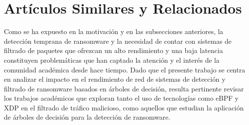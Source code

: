 \section{Artículos Similares y Relacionados}
Como se ha expuesto en la motivación y en las subsecciones anteriores, la detección temprana de ransomware y la necesidad de contar con sistemas de filtrado de paquetes que ofrezcan un alto rendimiento y una baja latencia constituyen problemáticas que han captado la atención y el interés de la comunidad académica desde hace tiempo. Dado que el presente trabajo se centra en analizar el impacto en el rendimiento de red de sistemas de detección y filtrado de ransomware basados en árboles de decisión, resulta pertinente revisar los trabajos académicos que exploran tanto el uso de tecnologías como eBPF y XDP en el filtrado de tráfico malicioso, como aquellos que estudian la aplicación de árboles de decisión para la detección de ransomware.
